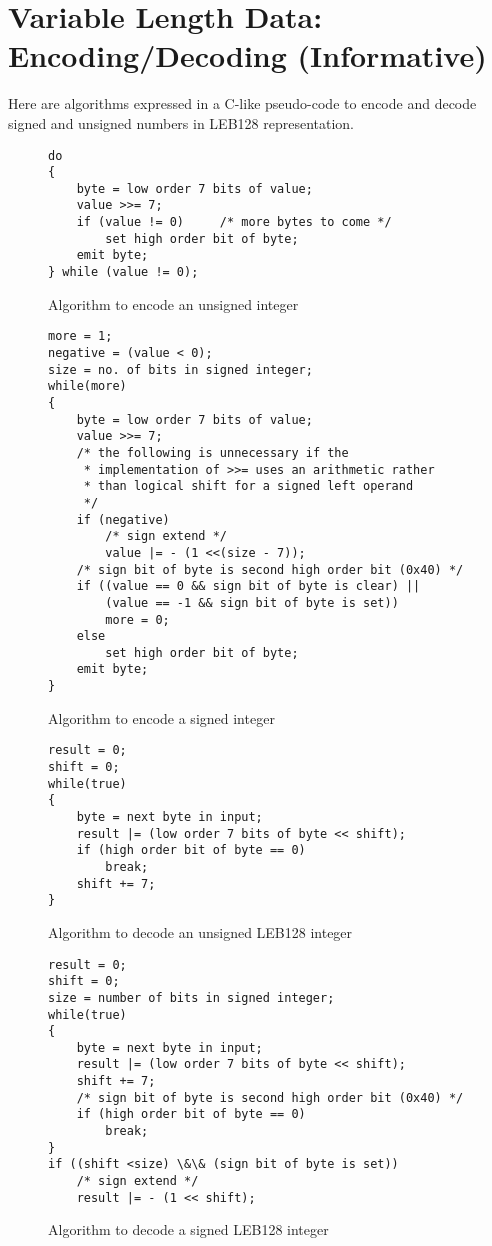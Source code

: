 
\chapter[Encoding/Decoding (Informative)]{Variable Length Data: Encoding/Decoding (Informative)}
\label{app:variablelengthdataencodingdecodinginformative}

Here are algorithms expressed in a C-like pseudo-code to
encode and decode signed and unsigned numbers in LEB128
representation.

\begin{figure}[here]
\begin{lstlisting}
do
{
    byte = low order 7 bits of value;
    value >>= 7;
    if (value != 0)     /* more bytes to come */
        set high order bit of byte;
    emit byte;
} while (value != 0);
\end{lstlisting}
\caption{Algorithm to encode an unsigned integer}
\end{figure}

\begin{figure}[here]
\begin{lstlisting}
more = 1;
negative = (value < 0);
size = no. of bits in signed integer;
while(more)
{
    byte = low order 7 bits of value;
    value >>= 7;
    /* the following is unnecessary if the
     * implementation of >>= uses an arithmetic rather
     * than logical shift for a signed left operand
     */
    if (negative)
        /* sign extend */
        value |= - (1 <<(size - 7));
    /* sign bit of byte is second high order bit (0x40) */
    if ((value == 0 && sign bit of byte is clear) ||
        (value == -1 && sign bit of byte is set))
        more = 0;
    else
        set high order bit of byte;
    emit byte;
}
\end{lstlisting}
\caption{Algorithm to encode a signed integer}
\end{figure}

\begin{figure}[here]
\begin{lstlisting}
result = 0;
shift = 0;
while(true)
{
    byte = next byte in input;
    result |= (low order 7 bits of byte << shift);
    if (high order bit of byte == 0)
        break;
    shift += 7;
}
\end{lstlisting}
\caption{Algorithm to decode an unsigned LEB128 integer}
\end{figure}

\begin{figure}[here]
\begin{lstlisting}
result = 0;
shift = 0;
size = number of bits in signed integer;
while(true)
{
    byte = next byte in input;
    result |= (low order 7 bits of byte << shift);
    shift += 7;
    /* sign bit of byte is second high order bit (0x40) */
    if (high order bit of byte == 0)
        break;
}
if ((shift <size) \&\& (sign bit of byte is set))
    /* sign extend */
    result |= - (1 << shift);
\end{lstlisting}
\caption{Algorithm to decode a signed LEB128 integer}
\end{figure}
